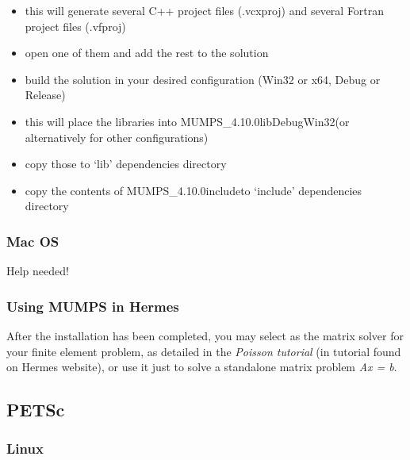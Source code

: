 \documentclass[a4paper,0pt,english]{sphinxmanual}
\begin{document}
\begin{itemize}
\begin{itemize}
\item {} 
this will generate several C++ project files (.vcxproj) and several Fortran project files (.vfproj)

\item {} 
open one of them and add the rest to the solution

\item {} 
build the solution in your desired configuration (Win32 or x64, Debug or Release)

\item {} 
this will place the libraries into MUMPS\_4.10.0libDebugWin32(or alternatively for other configurations)

\item {} 
copy those to `lib' dependencies directory

\item {} 
copy the contents of MUMPS\_4.10.0includeto `include' dependencies directory

\end{itemize}

\end{itemize}


\subsubsection{Mac OS}
\label{src/installation/matrix_solvers/mumps:mac-os}
Help needed!


\subsubsection{Using MUMPS in Hermes}
\label{src/installation/matrix_solvers/mumps:ref-usage-mumps}\label{src/installation/matrix_solvers/mumps:using-mumps-in-hermes}
After the installation has been completed, you may select   as the matrix solver for your finite element problem, as detailed
in the \emph{Poisson tutorial} (in tutorial found on Hermes website), or use it just to solve a standalone matrix problem \emph{Ax = b}.


\subsection{PETSc}
\label{src/installation/matrix_solvers/petsc:petsc}\label{src/installation/matrix_solvers/petsc::doc}

\subsubsection{Linux}
\label{src/installation/matrix_solvers/petsc:petsc-home-page}\label{src/installation/matrix_solvers/petsc:linux}
\end{document}
